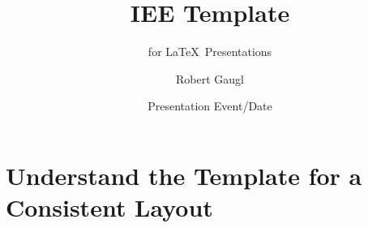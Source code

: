 \documentclass[aspectratio=169]{beamer}
\title[Short Title]{IEE Template}
\subtitle{for \LaTeX~Presentations}
\author{Robert Gaugl}
\date{Presentation Event/Date}
\institute{Institute of Electricity Economics and Energy Innovation}
\begin{document}
\begin{frame}[plain]
    \maketitleslide
\end{frame}


\section{Understand the \textbf{Template} for a Consistent Layout}

\begin{frame}
\end{frame}
\end{document}
